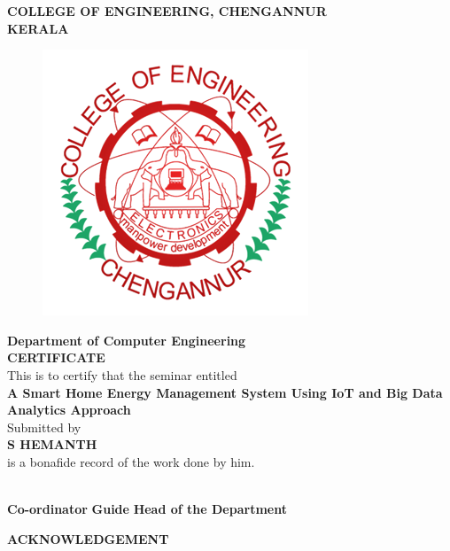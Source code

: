 \documentclass[a4paper,12pt,oneside]{article}
\begin{document}
\newpage
\thispagestyle{empty}
\begin{center}
\setlength{\baselineskip}{1.5\baselineskip}
{\large\textbf{COLLEGE OF ENGINEERING, CHENGANNUR}}
\\
{\large\textbf{KERALA}}
\\
\begin{figure}[H]
\centering
\includegraphics[scale=0.5]{ceclogo.png}
\end{figure}
\setlength{\baselineskip}{1.5\baselineskip}
\textbf{Department of Computer Engineering}
\\
\textbf{CERTIFICATE}
\\
This is to certify that the seminar entitled
\\
\textbf{A Smart Home Energy Management System
Using IoT and Big Data Analytics Approach}
\\
Submitted by
\\
\textbf{S HEMANTH}
\\
is a bonafide record of the work done by him.
\end{center}
\vspace{30ex}
\hspace{55ex}
\\

\hspace{0ex}
\textbf{Co-ordinator}
\hspace{18ex}
\textbf{Guide}
\hspace{18ex}
\textbf{Head of the Department}
\newpage
{}
\renewcommand{\headrulewidth}{0.0pt}
\renewcommand{\footrulewidth}{0.0pt}
\begin{center}
\large{\textbf{ACKNOWLEDGEMENT}}
\end{center}
\vspace{6ex}
\setlength{\baselineskip}{1.5\baselineskip}
\end{document}
